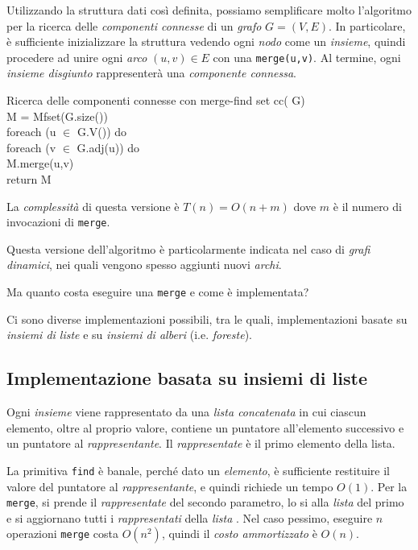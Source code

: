 \noindent
Utilizzando la struttura dati così definita, possiamo semplificare molto
l'algoritmo per la ricerca delle \emph{componenti connesse} di un \emph{grafo}
$G=(V,E)$. In particolare, è sufficiente inizializzare la struttura vedendo ogni
\emph{nodo} come un \emph{insieme}, quindi procedere ad unire ogni \emph{arco}
$(u,v)\in E$ con una \texttt{merge(u,v)}. Al termine, ogni \emph{insieme
disgiunto} rappresenterà una \emph{componente connessa}.

\begin{minicode}{Ricerca delle componenti connesse con merge-find set}
    \ind{} cc( G)\\
         M = Mfset(G.size())\\
        \indf foreach (u $\in$ G.V()) do\\
            \indff foreach (v $\in$ G.adj(u)) do\\
                M.merge(u,v)\\
        \indf return M
\end{minicode}\noindent
La \emph{complessità} di questa versione è $T(n)=O(n+m)$ dove $m$ è il numero di
invocazioni di \texttt{merge}.

\begin{note}
    Questa versione dell'algoritmo è particolarmente indicata nel caso di
    \emph{grafi dinamici}, nei quali vengono spesso aggiunti nuovi \emph{archi}.
\end{note}

\bigskip\noindent
Ma quanto costa eseguire una \texttt{merge} e come è implementata?

Ci sono diverse implementazioni possibili, tra le quali, implementazioni basate
su \emph{insiemi di liste} e su \emph{insiemi di alberi} (i.e. \emph{foreste}).

\subsection{Implementazione basata su insiemi di liste}
Ogni \emph{insieme} viene rappresentato da una \emph{lista concatenata} in cui
ciascun elemento, oltre al proprio valore, contiene un puntatore all'elemento
successivo e un puntatore al \emph{rappresentante}. Il \emph{rappresentate} è
il primo elemento della lista.

La primitiva \texttt{find} è banale, perché dato un \emph{elemento}, è sufficiente
restituire il valore del puntatore al \emph{rappresentante}, e quindi richiede un
tempo $O(1)$. Per la \texttt{merge}, si prende il \emph{rappresentate} del secondo
parametro, lo si  alla \emph{lista} del primo e si aggiornano tutti i
\emph{rappresentati} della \emph{lista} . Nel caso pessimo, eseguire
$n$ operazioni \texttt{merge} costa $O(n^2)$, quindi il \emph{costo ammortizzato}
è $O(n)$.

